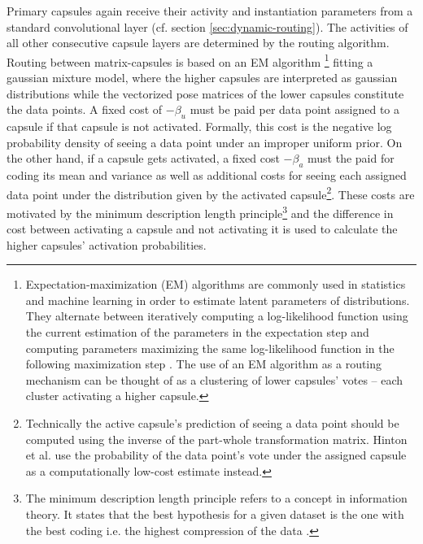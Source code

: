 Primary capsules again receive their activity and instantiation parameters from a standard convolutional layer (cf. section \ref{sec:dynamic-routing}). The activities of all other consecutive capsule layers are determined by the routing algorithm. Routing between matrix-capsules is based on an EM algorithm \footnote{Expectation-maximization (EM) algorithms are commonly used in statistics and machine learning in order to estimate latent parameters of distributions. They alternate between iteratively computing a log-likelihood function using the current estimation of the parameters in the expectation step and computing parameters maximizing the same log-likelihood function in the following maximization step \cite{dempster1977maximum}. The use of an EM algorithm as a routing mechanism can be thought of as a clustering of lower capsules' votes -- each cluster activating a higher capsule.} fitting a gaussian mixture model, where the higher capsules are interpreted as gaussian distributions while the vectorized pose matrices of the lower capsules constitute the data points. A fixed cost of $-\beta_u$ must be paid per data point assigned to a capsule if that capsule is not activated. Formally, this cost is the negative log probability density of seeing a data point under an improper uniform prior. On the other hand, if a capsule gets activated, a fixed cost $-\beta_a$ must the paid for coding its mean and variance as well as additional costs for seeing each assigned data point under the distribution given by the activated capsule\footnote{ Technically the active capsule's prediction of seeing a data point should be computed using the inverse of the part-whole transformation matrix. Hinton et al. use the probability of the data point's vote under the assigned capsule as a computationally low-cost estimate instead.}. These costs are motivated by the minimum description length principle\footnote{The minimum description length principle refers to a concept in information theory. It states that the best hypothesis for a given dataset is the one with the best coding i.e. the highest compression of the data \cite{rissanen1978modeling}.} and the difference in cost between activating a capsule and not activating it is used to calculate the higher capsules' activation probabilities.

